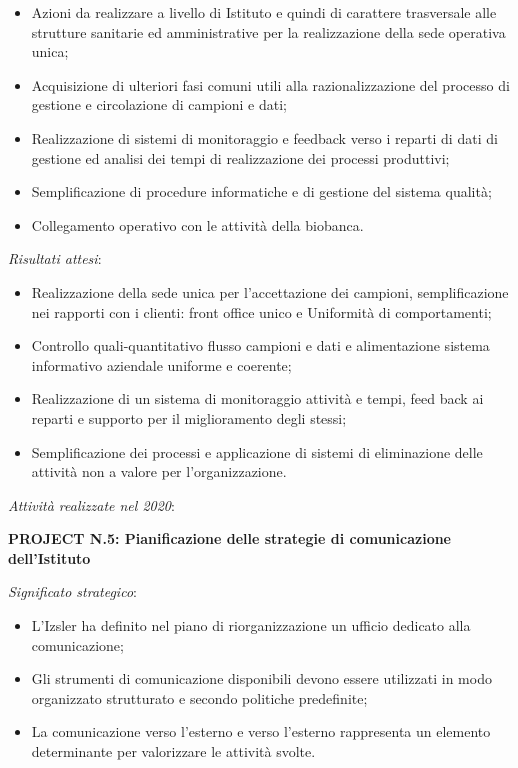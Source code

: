\documentclass[
  12pt,
]{article}
\providecommand{\tightlist}{%
  \setlength{\itemsep}{0pt}\setlength{\parskip}{0pt}}
\begin{document}
\begin{itemize}
\tightlist
\item
  Azioni da realizzare a livello di Istituto e quindi di carattere
  trasversale alle strutture sanitarie ed amministrative per la
  realizzazione della sede operativa unica;
\item
  Acquisizione di ulteriori fasi comuni utili alla razionalizzazione del
  processo di gestione e circolazione di campioni e dati;
\item
  Realizzazione di sistemi di monitoraggio e feedback verso i reparti di
  dati di gestione ed analisi dei tempi di realizzazione dei processi
  produttivi;
\item
  Semplificazione di procedure informatiche e di gestione del sistema
  qualità;
\item
  Collegamento operativo con le attività della biobanca.
\end{itemize}

\emph{Risultati attesi}:

\begin{itemize}
\tightlist
\item
  Realizzazione della sede unica per l'accettazione dei campioni,
  semplificazione nei rapporti con i clienti: front office unico e
  Uniformità di comportamenti;
\item
  Controllo quali-quantitativo flusso campioni e dati e alimentazione
  sistema informativo aziendale uniforme e coerente;
\item
  Realizzazione di un sistema di monitoraggio attività e tempi, feed
  back ai reparti e supporto per il miglioramento degli stessi;
\item
  Semplificazione dei processi e applicazione di sistemi di eliminazione
  delle attività non a valore per l'organizzazione.
\end{itemize}

\emph{Attività realizzate nel 2020}:

\textbf{PROJECT N.5: Pianificazione delle strategie di comunicazione
dell'Istituto}

\emph{Significato strategico}:

\begin{itemize}
\tightlist
\item
  L'Izsler ha definito nel piano di riorganizzazione un ufficio dedicato
  alla comunicazione;
\item
  Gli strumenti di comunicazione disponibili devono essere utilizzati in
  modo organizzato strutturato e secondo politiche predefinite;
\item
  La comunicazione verso l'esterno e verso l'esterno rappresenta un
  elemento determinante per valorizzare le attività svolte.
\end{itemize}
\end{document}
